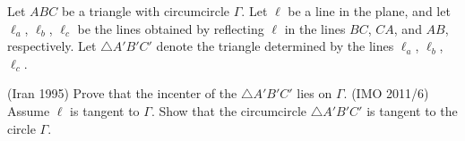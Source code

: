 \documentclass[11pt]{scrartcl}
\begin{document}
\begin{problem}
  Let $ABC$ be a triangle with circumcircle $\Gamma$.
  Let $\ell$ be a line in the plane, and let $\ell_a$, $\ell_b$, $\ell_c$ be the lines obtained
  by reflecting $\ell$ in the lines $BC$, $CA$, and $AB$, respectively.
  Let $\triangle A'B'C'$ denote the triangle determined by the lines $\ell_a$, $\ell_b$, $\ell_c$.
  \begin{enumerate}[(a)]
    \ii (Iran 1995) Prove that the incenter of the $\triangle A'B'C'$ lies on $\Gamma$.
    \ii (IMO 2011/6) Assume $\ell$ is tangent to $\Gamma$.
    Show that the circumcircle $\triangle A'B'C'$ is tangent to the circle $\Gamma$.
  \end{enumerate}
\end{problem}
\end{document}
